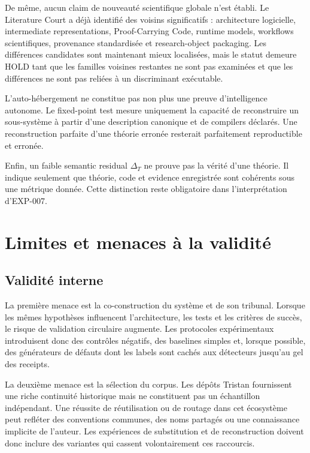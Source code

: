De même, aucun claim de nouveauté scientifique globale n'est établi. Le Literature Court a déjà identifié des voisins significatifs : architecture logicielle, intermediate representations, Proof-Carrying Code, runtime models, workflows scientifiques, provenance standardisée et research-object packaging. Les différences candidates sont maintenant mieux localisées, mais le statut demeure HOLD tant que les familles voisines restantes ne sont pas examinées et que les différences ne sont pas reliées à un discriminant exécutable.

L'auto-hébergement ne constitue pas non plus une preuve d'intelligence autonome. Le fixed-point test mesure uniquement la capacité de reconstruire un sous-système à partir d'une description canonique et de compilers déclarés. Une reconstruction parfaite d'une théorie erronée resterait parfaitement reproductible et erronée.

Enfin, un faible semantic residual $\Delta_T$ ne prouve pas la vérité d'une théorie. Il indique seulement que théorie, code et evidence enregistrée sont cohérents sous une métrique donnée. Cette distinction reste obligatoire dans l'interprétation d'EXP-007.

\chapter{Limites et menaces à la validité}

\section{Validité interne}

La première menace est la co-construction du système et de son tribunal. Lorsque les mêmes hypothèses influencent l'architecture, les tests et les critères de succès, le risque de validation circulaire augmente. Les protocoles expérimentaux introduisent donc des contrôles négatifs, des baselines simples et, lorsque possible, des générateurs de défauts dont les labels sont cachés aux détecteurs jusqu'au gel des receipts.

La deuxième menace est la sélection du corpus. Les dépôts Tristan fournissent une riche continuité historique mais ne constituent pas un échantillon indépendant. Une réussite de réutilisation ou de routage dans cet écosystème peut refléter des conventions communes, des noms partagés ou une connaissance implicite de l'auteur. Les expériences de substitution et de reconstruction doivent donc inclure des variantes qui cassent volontairement ces raccourcis.

